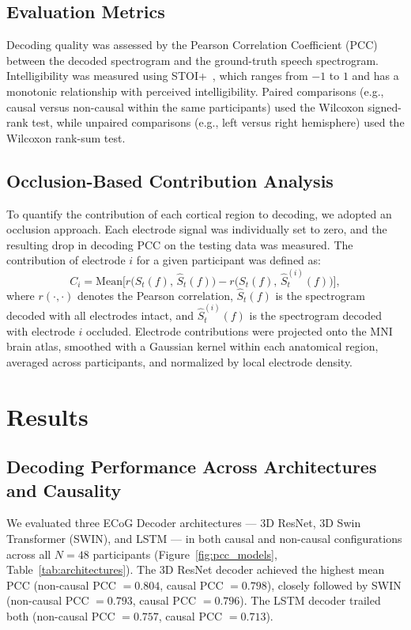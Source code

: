 \documentclass[10pt]{article}
\begin{document}
\subsection{Evaluation Metrics}

Decoding quality was assessed by the Pearson Correlation Coefficient (PCC) between the decoded spectrogram and the ground-truth speech spectrogram. Intelligibility was measured using STOI+~\cite{taal2011algorithm,relanoiborra2016sepsm}, which ranges from $-1$ to $1$ and has a monotonic relationship with perceived intelligibility. Paired comparisons (e.g., causal versus non-causal within the same participants) used the Wilcoxon signed-rank test, while unpaired comparisons (e.g., left versus right hemisphere) used the Wilcoxon rank-sum test.

\subsection{Occlusion-Based Contribution Analysis}

To quantify the contribution of each cortical region to decoding, we adopted an occlusion approach. Each electrode signal was individually set to zero, and the resulting drop in decoding PCC on the testing data was measured. The contribution of electrode $i$ for a given participant was defined as:
\begin{equation}
C_i = \mathrm{Mean}\bigl[r\bigl(S_t(f),\,\hat{S}_t(f)\bigr) - r\bigl(S_t(f),\,\hat{S}_t^{(i)}(f)\bigr)\bigr],
\end{equation}
where $r(\cdot,\cdot)$ denotes the Pearson correlation, $\hat{S}_t(f)$ is the spectrogram decoded with all electrodes intact, and $\hat{S}_t^{(i)}(f)$ is the spectrogram decoded with electrode $i$ occluded. Electrode contributions were projected onto the MNI brain atlas, smoothed with a Gaussian kernel within each anatomical region, averaged across participants, and normalized by local electrode density.

\section{Results}

\subsection{Decoding Performance Across Architectures and Causality}

We evaluated three ECoG Decoder architectures --- 3D ResNet, 3D Swin Transformer (SWIN), and LSTM --- in both causal and non-causal configurations across all $N=48$ participants (Figure~\ref{fig:pcc_models}, Table~\ref{tab:architectures}). The 3D ResNet decoder achieved the highest mean PCC (non-causal PCC $=0.804$, causal PCC $=0.798$), closely followed by SWIN (non-causal PCC $=0.793$, causal PCC $=0.796$). The LSTM decoder trailed both (non-causal PCC $=0.757$, causal PCC $=0.713$).
\end{document}
